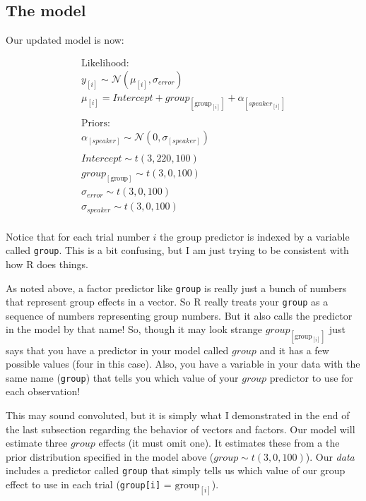 \documentclass[
]{book}
\begin{document}
\hypertarget{the-model}{%
\subsection{The model}\label{the-model}}

Our updated model is now:

\begin{equation}
\begin{split}
\textrm{Likelihood:} \\
y_{[i]} \sim \mathcal{N}(\mu_{[i]},\sigma_{error}) \\
\mu_{[i]} = Intercept + group_{[\mathrm{group}_{[i]}]} + \alpha_{[speaker_{[i]}]} \\\\
\textrm{Priors:} \\
\alpha_{[speaker]} \sim \mathcal{N}(0,\sigma_{[speaker]}) \\ \\ 
Intercept \sim t(3, 220, 100) \\ 
group_{[\mathrm{group}]} \sim t(3, 0, 100) \\ 
\sigma_{error} \sim t(3, 0, 100) \\
\sigma_{speaker} \sim t(3, 0, 100) \\ 
\end{split}
\label{eq:41}
\end{equation}

Notice that for each trial number \(i\) the group predictor is indexed by a variable called \texttt{group}. This is a bit confusing, but I am just trying to be consistent with how R does things.

As noted above, a factor predictor like \texttt{group} is really just a bunch of numbers that represent group effects in a vector. So R really treats your \texttt{group} as a sequence of numbers representing group numbers. But it also calls the predictor in the model by that name! So, though it may look strange \(group_{[\mathrm{group}_{[i]}]}\) just says that you have a predictor in your model called \(group\) and it has a few possible values (four in this case). Also, you have a variable in your data with the same name (\texttt{group}) that tells you which value of your \(group\) predictor to use for each observation!

This may sound convoluted, but it is simply what I demonstrated in the end of the last subsection regarding the behavior of vectors and factors. Our model will estimate three \(group\) effects (it must omit one). It estimates these from a the prior distribution specified in the model above (\(group \sim t(3, 0, 100)\)). Our \emph{data} includes a predictor called \texttt{group} that simply tells us which value of our group effect to use in each trial (\texttt{group{[}i{]}} = \(\mathrm{group}_{[i]}\)).
\end{document}
